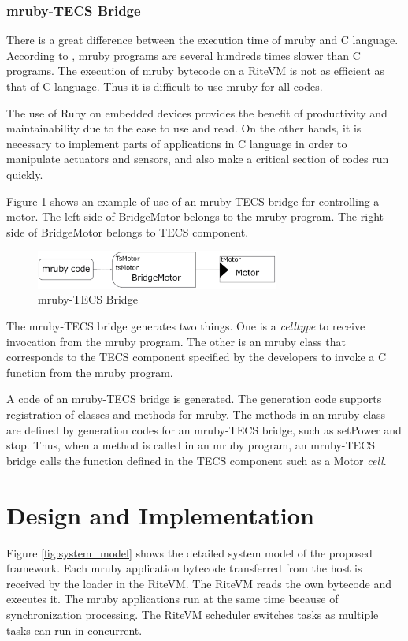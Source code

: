 \documentclass{sig-alternate-05-2015}
\begin{document}
\subsubsection{mruby-TECS Bridge}
There is a great difference between the execution time of mruby and C language.
According to  \cite{par:mrubyonTECS}, mruby programs are several hundreds times slower than C programs.
The execution of mruby bytecode on a RiteVM is not as efficient as that of C language.
Thus it is difficult to use mruby for all codes.

The use of Ruby on embedded devices provides the benefit of productivity and maintainability due to the ease to use and read.
On the other hands, it is necessary to implement parts of applications in C language in order to manipulate actuators and sensors, and also make a critical section of codes run quickly.

Figure \ref{fig:mruby_TECS_bridge} shows an example of use of an mruby-TECS bridge for controlling a motor.
The left side of BridgeMotor belongs to the mruby program.
The right side of BridgeMotor belongs to TECS component.
\begin{figure}[t]
    \centering
    \includegraphics[width=8cm,clip]{figure/mruby_TECS_bridge.eps}
    \caption{mruby-TECS Bridge}
    \label{fig:mruby_TECS_bridge}
\end{figure}

The mruby-TECS bridge generates two things.
One is a {\it celltype} to receive invocation from the mruby program.
The other is an mruby class that corresponds to the TECS component specified by the developers to invoke a C function from the mruby program.

A code of an mruby-TECS bridge is generated.
The generation code supports registration of classes and methods for mruby.
The methods in an mruby class are defined by generation codes for an mruby-TECS bridge, such as setPower and stop.
Thus, when a method is called in an mruby program, an mruby-TECS bridge calls the function defined in the TECS component such as a Motor {\it cell}.

\section{Design and Implementation}
\label{sec:Design and Implementation}
Figure \ref{fig:system_model} shows the detailed system model of the proposed framework.
Each mruby application bytecode transferred from the host is received by the loader in the RiteVM.
The RiteVM reads the own bytecode and executes it.
The mruby applications run at the same time because of synchronization processing.
The RiteVM scheduler switches tasks as multiple tasks can run in concurrent.
\end{document}
